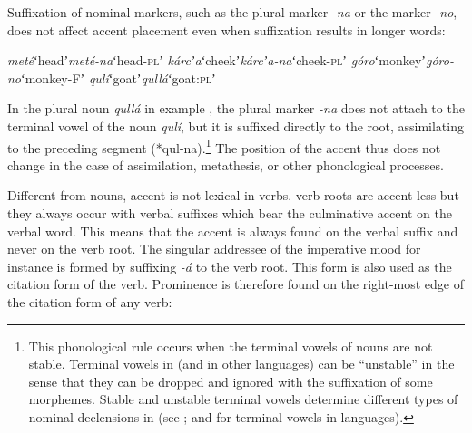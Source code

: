 \documentclass[output=paper]{LSP/langsci}
\begin{document}
Suffixation of nominal markers, such as the plural marker \textit{-na} or the   marker \textit{-no}, does not affect accent placement even when suffixation results in longer words:

\begin{exe} 
	\ex \label{ex:Petrollino:nominflections} \begin{xlist}
	\ex \textit{meté}\hspace{12mm}ʻheadʼ\hspace{9mm}\textit{meté-na}\hspace{4mm}ʻhead-\textsc{pl}ʼ
    \ex \textit{kárcʼa}\hspace{10mm}ʻcheekʼ\hspace{8mm}\textit{kárcʼa-na}\hspace{2mm}ʻcheek-\textsc{pl}ʼ
    \ex \textit{góro}\hspace{13mm}ʻmonkeyʼ\hspace{4mm}\textit{góro-no}\hspace{5mm}ʻmonkey-Fʼ
    \ex \textit{qulí}\hspace{13mm}ʻgoatʼ\hspace{10mm}\textit{qullá}\hspace{9mm}ʻgoat:\textsc{pl}ʼ\label{ex:Petrollino:qullá}
\end{xlist}
\end{exe}
In the plural noun \textit{qullá} in example , the plural marker \textit{-na} does not attach to the terminal vowel of the noun \textit{qulí}, but it is suffixed directly to the root, assimilating to the preceding  segment (*qul-na).\footnote{This phonological rule occurs when the terminal vowels of nouns are not stable. Terminal vowels in  (and in other  languages) can be “unstable” in the sense that they can be dropped and ignored with the suffixation of some morphemes. Stable and unstable terminal vowels determine different types of nominal declensions in  (see \citealt[73-77]{Petrollino2016}; \citealt{Hayward1987} and \citealt{Azeb2012} for terminal vowels in  languages).} The position of the accent thus does not change in the case of assimilation, metathesis, or other phonological processes.

Different from nouns, accent is not lexical in verbs.  verb roots are accent-less but they always occur with verbal suffixes which bear the culminative accent on the verbal word. This means that the accent is always found on the verbal suffix and never on the verb root. The singular addressee of the imperative mood for instance is formed by suffixing \textit{-á} to the verb root. This form is also used as the citation form of the verb. Prominence is therefore found on the right-most edge of the citation form of any verb:
\end{document}
